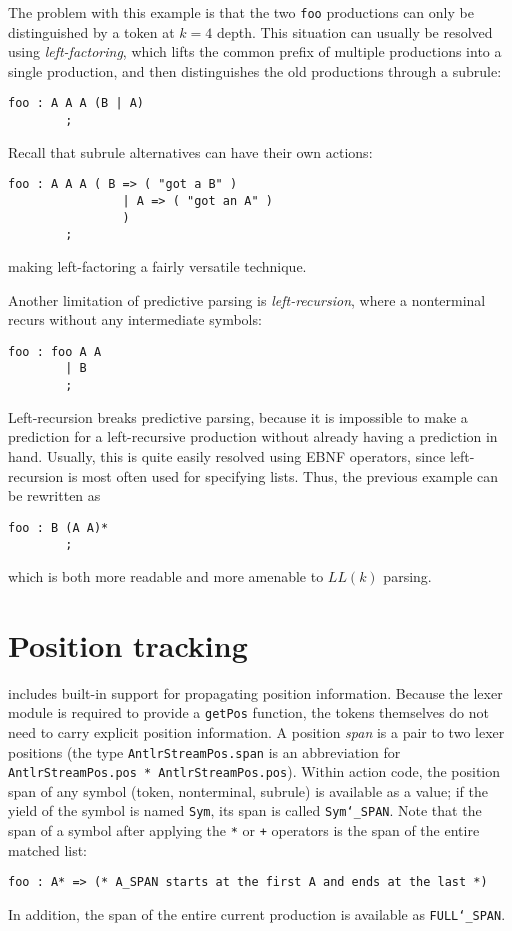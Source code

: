 The problem with this example is that the two \texttt{foo} productions can only be distinguished by a token at $k = 4$ depth.  This situation can usually be resolved using \emph{left-factoring}, which lifts the common prefix of multiple productions into a single production, and then distinguishes the old productions through a subrule:
\begin{lstlisting}[language=MLAntlr]
    foo : A A A (B | A)
        ;
\end{lstlisting}%
Recall that subrule alternatives can have their own actions:
\begin{lstlisting}[language=MLAntlr]
    foo : A A A ( B => ( "got a B" ) 
                | A => ( "got an A" )
                )
        ;
\end{lstlisting}%
making left-factoring a fairly versatile technique.

Another limitation of predictive parsing is \emph{left-recursion}, where a nonterminal recurs without any intermediate symbols:
\begin{lstlisting}[language=MLAntlr]
    foo : foo A A
        | B
        ;
\end{lstlisting}%
Left-recursion breaks predictive parsing, because it is impossible to make a prediction for a left-recursive production without already having a prediction in hand.  Usually, this is quite easily resolved using EBNF operators, since left-recursion is most often used for specifying lists.  Thus, the previous example can be rewritten as
\begin{lstlisting}[language=MLAntlr]
    foo : B (A A)*
        ;
\end{lstlisting}%
which is both more readable and more amenable to $LL(k)$ parsing.

\section{Position tracking}

\antlr{} includes built-in support for propagating position information.  Because the lexer module is required to provide a \texttt{getPos} function, the tokens themselves do not need to carry explicit position information.
A position \emph{span} is a pair to two lexer positions (the type \texttt{AntlrStreamPos.span} is
an abbreviation for \texttt{AntlrStreamPos.pos * AntlrStreamPos.pos}).
Within action code, the position span of any symbol (token, nonterminal, subrule) is available as a value; if the yield of the symbol is named \texttt{Sym}, its span is called \texttt{Sym\char`\_SPAN}.
Note that the span of a symbol after applying the \texttt{*} or \texttt{+} operators is the
span of the entire matched list:
\begin{lstlisting}[language=MLAntlr]
    foo : A* => (* A_SPAN starts at the first A and ends at the last *)
\end{lstlisting}%
In addition, the span of the entire current production is available as \texttt{FULL\char`\_SPAN}.


